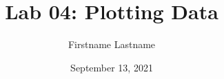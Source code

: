 \newcommand{\course}{MATH 3341}
\title{Lab 04: Plotting Data}
\author{Firstname Lastname}
\date{September 13, 2021}
